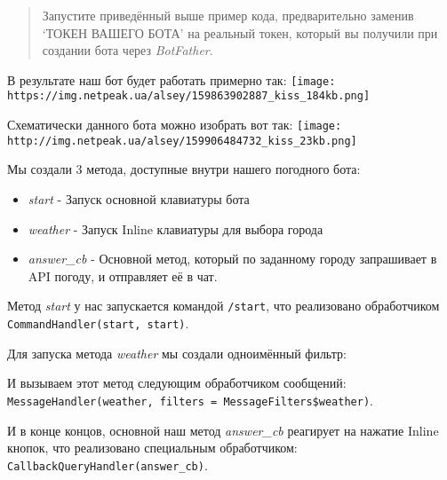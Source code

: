 \documentclass[
]{book}
\newenvironment{Shaded}{\begin{snugshade}}{\end{snugshade}}
\newcommand{\CommentTok}[1]{\textcolor[rgb]{0.56,0.35,0.01}{\textit{#1}}}
\newcommand{\ControlFlowTok}[1]{\textcolor[rgb]{0.13,0.29,0.53}{\textbf{#1}}}
\newcommand{\DocumentationTok}[1]{\textcolor[rgb]{0.56,0.35,0.01}{\textbf{\textit{#1}}}}
\newcommand{\FunctionTok}[1]{\textcolor[rgb]{0.00,0.00,0.00}{#1}}
\newcommand{\NormalTok}[1]{#1}
\newcommand{\OtherTok}[1]{\textcolor[rgb]{0.56,0.35,0.01}{#1}}
\newcommand{\SpecialCharTok}[1]{\textcolor[rgb]{0.00,0.00,0.00}{#1}}
\newcommand{\StringTok}[1]{\textcolor[rgb]{0.31,0.60,0.02}{#1}}
\providecommand{\tightlist}{%
  \setlength{\itemsep}{0pt}\setlength{\parskip}{0pt}}
\begin{document}
\begin{quote}
Запустите приведённый выше пример кода, предварительно заменив `ТОКЕН ВАШЕГО БОТА' на реальный токен, который вы получили при создании бота через \emph{BotFather}.
\end{quote}

В результате наш бот будет работать примерно так:
\texttt{[image: https://img.netpeak.ua/alsey/159863902887\_kiss\_184kb.png]}

Схематически данного бота можно изобрать вот так:
\texttt{[image: http://img.netpeak.ua/alsey/159906484732\_kiss\_23kb.png]}

Мы создали 3 метода, доступные внутри нашего погодного бота:

\begin{itemize}
\tightlist
\item
  \emph{start} - Запуск основной клавиатуры бота
\item
  \emph{weather} - Запуск Inline клавиатуры для выбора города
\item
  \emph{answer\_cb} - Основной метод, который по заданному городу запрашивает в API погоду, и отправляет её в чат.
\end{itemize}

Метод \emph{start} у нас запускается командой \texttt{/start}, что реализовано обработчиком \texttt{CommandHandler(\textquotesingle{}start\textquotesingle{},\ start)}.

Для запуска метода \emph{weather} мы создали одноимённый фильтр:

\begin{Shaded}
\end{Shaded}

И вызываем этот метод следующим обработчиком сообщений: \texttt{MessageHandler(weather,\ filters\ =\ MessageFilters\$weather)}.

И в конце концов, основной наш метод \emph{answer\_cb} реагирует на нажатие Inline кнопок, что реализовано специальным обработчиком: \texttt{CallbackQueryHandler(answer\_cb)}.
\end{document}

